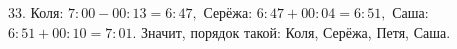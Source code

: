 33. Коля: $7:00-00:13=6:47,$ Серёжа: $6:47+00:04=6:51,$ Саша: $6:51+00:10=7:01.$ Значит, порядок такой: Коля, Серёжа, Петя, Саша.\\
